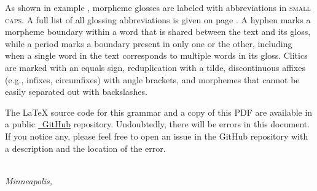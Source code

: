 As shown in example , morpheme glosses are labeled with abbreviations in \textsc{small caps}. A full list of all glossing abbreviations is given on page \pageref{cha:glossary}. A hyphen marks a morpheme boundary within a word that is shared between the text and its gloss, while a period marks a boundary present in only one or the other, including when a single word in the text corresponds to multiple words in its gloss. Clitics are marked with an equals sign, reduplication with a tilde, discontinuous affixes (e.g., infixes, circumfixes) with angle brackets, and morphemes that cannot be easily separated out with backslashes.

The \LaTeX{} source code for this grammar and a copy of this PDF are available in a public \href{https://github.com/nai888/ardusa}{\faGithub~GitHub} repository. Undoubtedly, there will be errors in this document. If you notice any, please feel free to open an issue in the GitHub repository with a description and the location of the error.

\begin{flushright}
	\makeatletter
	\textit{\@author}\\
	\textit{Minneapolis, }
	\makeatother
\end{flushright}